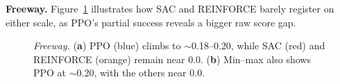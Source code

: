 \noindent \textbf{Freeway.} Figure~\ref{fig:freeway_combined} illustrates how SAC and REINFORCE barely register on either scale, as PPO's partial success reveals a bigger raw score gap.
\begin{figure} 
	\centering
	\quad
	\caption{\emph{Freeway.}
		(\textbf{a}) PPO (blue) climbs to $\sim$\num{0.18}--\num{0.20}, while SAC (red) and REINFORCE (orange) remain near 0.0.
		(\textbf{b}) Min--max also shows PPO at $\sim$\num{0.20}, with the others near 0.0.}
	\label{fig:freeway_combined}
\end{figure}



\medskip

